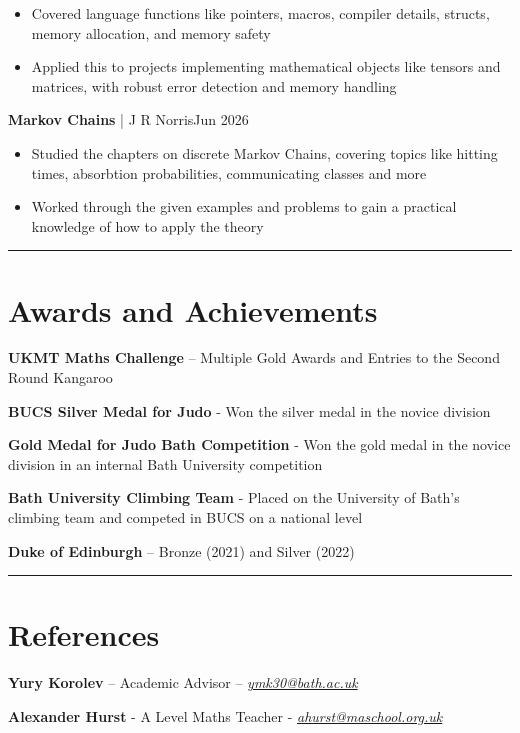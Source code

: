 \documentclass[11pt, a4paper]{article}
\newcommand{\cvline}{\vspace{-4pt}\noindent\rule{\linewidth}{0.5pt}\vspace{-8pt}}
\begin{document}
\begin{itemize}[leftmargin=*, itemsep=-3pt, topsep=2pt]
\item Covered language functions like pointers, macros, compiler details, 
  structs, memory allocation, and memory safety
\item Applied this to projects implementing mathematical objects like tensors 
  and matrices, with robust error detection and memory handling
\end{itemize}


\vspace{2pt}
{\large\textbf{Markov Chains} | J R Norris\hfill	Jun 2026}
\vspace{2pt}

\begin{itemize}[leftmargin=*, itemsep=-3pt, topsep=2pt]
	\item Studied the chapters on discrete Markov Chains, covering topics like
		hitting times, absorbtion probabilities, communicating classes and more
	\item Worked through the given examples and problems to gain a practical
		knowledge of how to apply the theory
\end{itemize}

\cvline
\section{Awards and Achievements}
\vspace{2pt}
{\large

\textbf{UKMT Maths Challenge} – Multiple Gold Awards and Entries to the Second Round Kangaroo

\vspace{2pt}

\textbf{BUCS Silver Medal for Judo} - Won the silver medal in the novice division 

\vspace{2pt}

\textbf{Gold Medal for Judo Bath Competition} - Won the gold medal in the novice division in an internal Bath University competition

\vspace{2pt}

\textbf{Bath University Climbing Team} - Placed on the University of Bath's climbing team and competed in BUCS on a national level

\vspace{2pt}

\textbf{Duke of Edinburgh} – Bronze (2021) and Silver (2022)

\vspace{2pt}
}


\cvline
\section{References}
\vspace{2pt}
{
\large 
\textbf{Yury Korolev }– Academic Advisor – \href{mailto:ymk30@bath.ac.uk}{\textit{ymk30@bath.ac.uk}}

\textbf{Alexander Hurst }- A Level Maths Teacher - \href{mailto:ahurst@maschool.org.uk}{\textit{ahurst@maschool.org.uk}}
}
\end{document}
